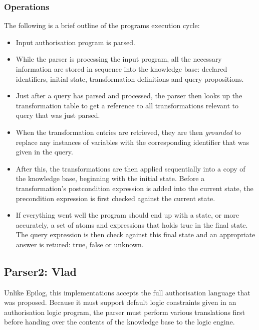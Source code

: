 \documentclass[a4paper,draft]{article}
\begin{document}
      \subsubsection{Operations}

        The following is a brief outline of the programs execution cycle:

        \begin{itemize}
          \item
            Input authorisation program is parsed.
          \item
            While the parser is processing the input program, all the
            necessary information are stored in sequence into the knowledge
            base: declared identifiers, initial state, transformation
            definitions and query propositions.
          \item
            Just after a query has parsed and processed, the parser then
            looks up the transformation table to get a reference to all
            transformations relevant to query that was just parsed.
          \item
            When the transformation entries are retrieved, they are then
            \emph{grounded} to replace any instances of variables with
            the corresponding identifier that was given in the query.
          \item
            After this, the transformations are then applied sequentially
            into a copy of the knowledge base, beginning with the initial
            state. Before a transformation's postcondition expression is added
            into the current state, the precondition expression is first
            checked against the current state.
          \item
            If everything went well the program should end up with a state,
            or more accurately, a set of atoms and expressions that holds
            true in the final state. The query expression is then check
            against this final state and an appropriate answer is retured:
            true, false or unknown.
            
        \end{itemize}

    \subsection{Parser2: Vlad}

      Unlike Epilog, this implementations accepts the full authorisation
      language that was proposed. Because it must support default logic
      constraints given in an authorisation logic program, the parser must
      perform various translations first before handing over the contents
      of the knowledge base to the logic engine.
\end{document}
